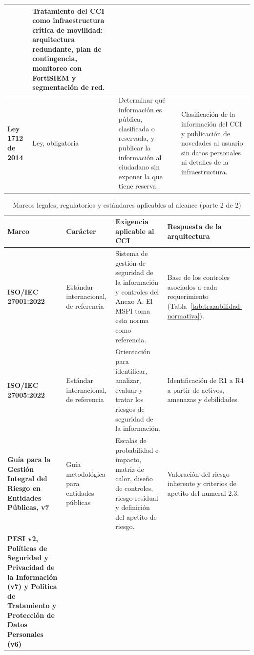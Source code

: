 \begin{table}[H]
\begin{tabularx}{\textwidth}{@{}>{\raggedright\arraybackslash}p{} Y Y Y@{}}
		& Tratamiento del CCI como infraestructura crítica de movilidad: arquitectura redundante, plan de contingencia, monitoreo con FortiSIEM y segmentación de red.
		\\
		\midrule
		\textbf{Ley 1712 de 2014} \parencite{ley1712de2014}
		& Ley, obligatoria
		& Determinar qué información es pública, clasificada o reservada, y publicar la información al ciudadano sin exponer la que tiene reserva.
		& Clasificación de la información del CCI y publicación de novedades al usuario sin datos personales ni detalles de la infraestructura.
		\\
		\bottomrule
	\end{tabularx}
\end{table}

\begin{table}[H]
	\caption{Marcos legales, regulatorios y estándares aplicables al alcance (parte 2 de 2)}
	\label{tab:normativa-2}
	\centering
	\footnotesize
	\renewcommand{\arraystretch}{1.15}
	\begin{tabularx}{\textwidth}{@{}>{\raggedright\arraybackslash}p{} Y Y Y@{}}
		\toprule
		\textbf{Marco} & \textbf{Carácter} & \textbf{Exigencia aplicable al CCI} & \textbf{Respuesta de la arquitectura} \\
		\midrule
		\textbf{ISO/IEC 27001:2022} \parencite{iso27001}
		& Estándar internacional, de referencia
		& Sistema de gestión de seguridad de la información y controles del Anexo A. El MSPI toma esta norma como referencia.
		& Base de los controles asociados a cada requerimiento (Tabla~\ref{tab:trazabilidad-normativa}).
		\\
		\midrule
		\textbf{ISO/IEC 27005:2022} \parencite{iso27005}
		& Estándar internacional, de referencia
		& Orientación para identificar, analizar, evaluar y tratar los riesgos de seguridad de la información.
		& Identificación de R1 a R4 a partir de activos, amenazas y debilidades.
		\\
		\midrule
		\textbf{Guía para la Gestión Integral del Riesgo en Entidades Públicas, v7} \parencite{funcionpublica2025}
		& Guía metodológica para entidades públicas
		& Escalas de probabilidad e impacto, matriz de calor, diseño de controles, riesgo residual y definición del apetito de riesgo.
		& Valoración del riesgo inherente y criterios de apetito del numeral 2.3.
		\\
		\midrule
		\textbf{PESI v2, Políticas de Seguridad y Privacidad de la Información (v7) y Política de Tratamiento y Protección de Datos Personales (v6)} \parencite{transmilenio2025pesi,transmilenio2026politicas,transmilenio2025politicaDatos}

\end{tabularx}
\end{table}
